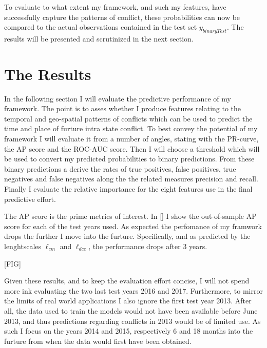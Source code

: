 \documentclass[a4paper]{article}
\begin{document}
To evaluate to what extent my framework, and such my features, have successfully capture the patterns of conflict, these probabilities can now be compared to the actual observations contained in the test set $y_{binaryTest}$. The results will be presented and scrutinized in the next section.\par

\section{The Results}

In the following section I will evaluate the predictive performance of my framework. The point is to asses whether I produce features relating to the temporal and geo-spatial patterns of conflicts which can be used to predict the time and place of furture intra state conflict. To best convey the potential of my framework I will evaluate it from a number of angles, stating with the PR-curve, the AP score and the ROC-AUC score. Then I will choose a threshold which will be used to convert my predicted probabilities to binary predictions. From these binary predictions a derive the rates of true positives, false positives, true negatives and false negatives along the the related measures precision and recall. Finally I evaluate the relative importance for the eight features use in the final predictive effort.\par

The AP score is the prime metrics of interest. In \autoref{} I show the out-of-sample AP score for each of the test years used. As expected the perfomance of my framwork drops the further I move into the furture. Specifically, and as predicted by the lenghtscales $\ell_{cm}$ and $\ell_{dce}$, the performance drops after 3 years.\par

[FIG]\par

Given these results, and to keep the evaluation effort concise, I will not spend more ink evaluating the two last test years 2016 and 2017. Furthermore, to mirror the limits of real world applications I also ignore the first test year 2013. After all, the data used to train the models would not have been available before June 2013, and thus predictions regarding conflicts in 2013 would be of limited use. As such I focus on the years 2014 and 2015, respectively 6 and 18 months into the furture from when the data would first have been obtained.\par %
\end{document}
